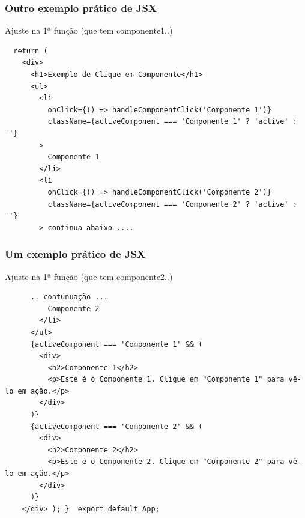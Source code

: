 \documentclass[13pt, xcolor={dvipsnames,svgnames}, portuguese]{beamer}
\begin{document}
\begin{frame}[fragile]
\frametitle{Outro exemplo prático de JSX}
Ajuste na 1ª função (que tem componente1..)

\begin{verbatim}
  return (
    <div>
      <h1>Exemplo de Clique em Componente</h1>
      <ul>
        <li
          onClick={() => handleComponentClick('Componente 1')}
          className={activeComponent === 'Componente 1' ? 'active' : ''}
        >
          Componente 1
        </li>
        <li
          onClick={() => handleComponentClick('Componente 2')}
          className={activeComponent === 'Componente 2' ? 'active' : ''}
        > continua abaixo ....
\end{verbatim}
\end{frame}



\begin{frame}[fragile]
\frametitle{Um exemplo prático de JSX}
Ajuste na 1ª função (que tem componente2..)

\begin{verbatim}
      .. contunuação ...
          Componente 2
        </li>
      </ul>
      {activeComponent === 'Componente 1' && (
        <div>
          <h2>Componente 1</h2>
          <p>Este é o Componente 1. Clique em "Componente 1" para vê-lo em ação.</p>
        </div>
      )}
      {activeComponent === 'Componente 2' && (
        <div>
          <h2>Componente 2</h2>
          <p>Este é o Componente 2. Clique em "Componente 2" para vê-lo em ação.</p>
        </div>
      )}
    </div> ); }  export default App;
\end{verbatim}
\end{frame}

\end{document}
